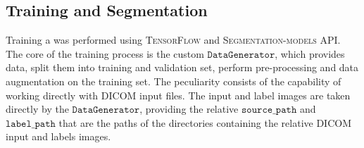 \documentclass{standalone}
\begin{document}
\subsection{Training and Segmentation}

Training a was performed using \textsc{TensorFlow}\cite{Tensorflow} and \textsc{Segmentation-models} API\cite{segmentation_models}.
The core of the training process is the custom $\mathtt{DataGenerator}$, which provides data, split them into training and validation set, perform pre-processing and data augmentation on the training set.
The peculiarity consists of the capability of working directly with DICOM input files.
The input and label images are taken directly by the $\mathtt{DataGenerator}$, providing the relative $\mathtt{source\_path}$ and $\mathtt{label\_path}$ that are the paths of the directories containing the relative DICOM input and labels images.
\end{document}
